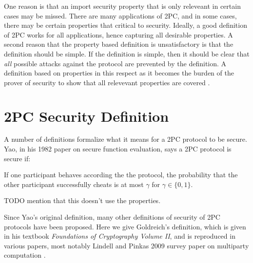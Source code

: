 One reason is that an import security property that is only releveant in certain cases may be missed.
There are many applications of 2PC, and in some cases, there may be certain properties that critical to security.
Ideally, a good definition of 2PC works for all applications, hence capturing all desirable properties.
A second reason that the property based definition is unsatisfactory is that the definition should be simple.
If the definition is simple, then it should be clear that \textit{all} possible attacks against the protocol are prevented by the definition.
A definition based on properties in this respect as it becomes the burden of the prover of security to show that all relevevant properties are covered \cite{lindell2009secure}.

\section{2PC Security Definition}
A number of definitions formalize what it means for a 2PC protocol to be secure.
Yao, in his 1982 paper on secure function evaluation, says a 2PC protocol is secure if:

\begin{blockquote}
If one participant behaves according the the protocol, the probability that the other participant successfully cheats is at most $\gamma$ for $\gamma \in \{0,1\}$.
\cite{get-source}
\end{blockquote}

TODO mention that this doesn't use the properties.

Since Yao's original definition, many other definitions of security of 2PC protocols have been proposed.
Here we give Goldreich's definition, which is given in his textbook \textit{Foundations of Cryptography Volume II}, and is reproduced in various papers, most notably Lindell and Pinkas 2009 survey paper on multiparty computation \cite{goldreich, lindell2009secure}.

